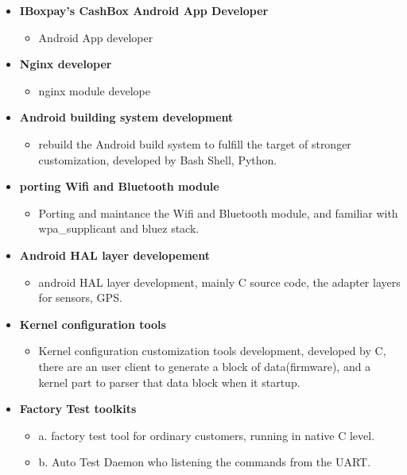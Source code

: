 \documentclass[a4paper, 10pt, titlepage]{article}
\begin{document}
\begin{itemize}


\item \textbf{IBoxpay's CashBox Android App Developer}
  \begin{itemize}
    \item Android App developer
  \end{itemize}


\item \textbf{Nginx developer}
  \begin{itemize}
    \item nginx module develope 
  \end{itemize}


\item \textbf{Android building system development}
  \begin{itemize}
    \item rebuild the Android build system to fulfill the target of stronger customization, developed by Bash Shell, Python.
  \end{itemize}

\item \textbf{porting Wifi and Bluetooth module}
  \begin{itemize}
    \item Porting and maintance the Wifi and Bluetooth module, and familiar with wpa\_supplicant and bluez stack.
  \end{itemize}

\item \textbf{Android HAL layer developement}
  \begin{itemize}
    \item android HAL layer development, mainly C source code, the adapter layers for sensors, GPS.
  \end{itemize}

\item \textbf{Kernel configuration tools}
  \begin{itemize}
    \item Kernel configuration customization tools development, developed by C, there are an user client to generate a block of data(firmware), and a kernel part to parser that data block when it startup.
  \end{itemize}

\item \textbf{Factory Test toolkits}
  \begin{itemize}
    \item a. factory test tool for ordinary customers, running in native C level. \newline{}
    \item b. Auto Test Daemon who listening the commands from the UART. 
  \end{itemize}


\end{itemize}
\end{document}
